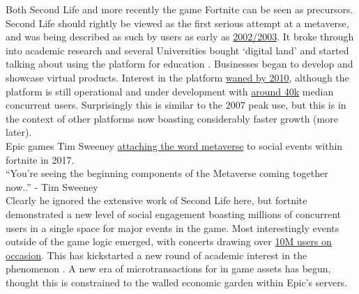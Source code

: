 Both Second Life and more recently the game Fortnite can be seen as precursors. Second Life should rightly be viewed as the first serious attempt at a metaverse, and was being described as such by users as early as \href{https://nwn.blogs.com/nwn/2003/06/the_early_creat.html}{2002/2003}. It broke through into academic research and several Universities bought `digital land' and started talking about using the platform for education \cite{sermon2008they, emp2006putting, kirriemuir2008spring, sant2009performance}. Businesses began to develop and showcase virtual products. Interest in the platform \href{https://trends.google.com/trends/explore?date=all&q=second\%20life}{waned by 2010}, although the platform is still operational and under development with \href{https://danielvoyager.wordpress.com/category/second-life-stats/}{around 40k} median concurrent users. Surprisingly this is similar to the 2007 peak use, but this is in the context of other platforms now boasting considerably faster growth (more later).\\
Epic games Tim Sweeney \href{https://venturebeat.com/2017/05/15/epic-games-tim-sweeney-fears-the-metaverse-will-be-a-proprietary-technology/}{attaching the word metaverse} to social events within fortnite in 2017.\\
``You’re seeing the beginning components of the Metaverse coming together now..'' - Tim Sweeney\\
Clearly he ignored the extensive work of Second Life here, but fortnite demonstrated a new level of social engagement boasting millions of concurrent users in a single space for major events in the game. Most interestingly events outside of the game logic emerged, with concerts drawing over \href{https://www.epicgames.com/fortnite/en-US/news/astronomical}{10M users on occasion}. This has kickstarted a new round of academic interest in the phenomenon \cite{marlatt2020capitalizing}. A new era of microtransactions for in game assets has begun, thought this is constrained to the walled economic garden within Epic's servers.

